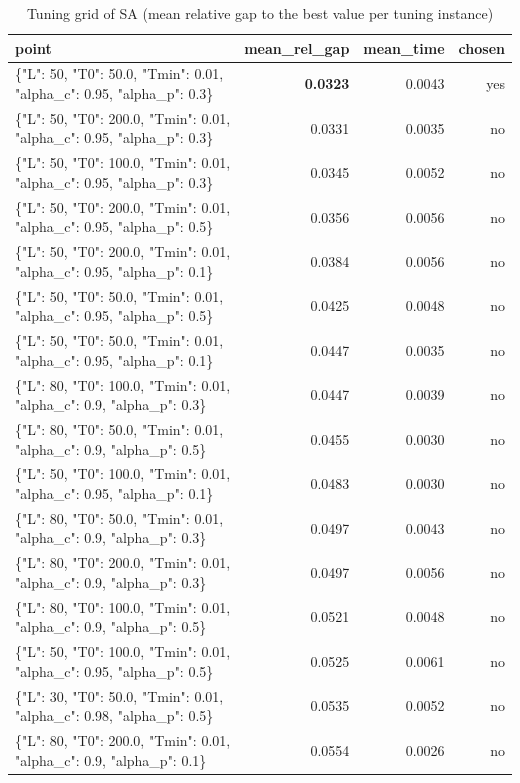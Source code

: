 \begin{table}[htbp]
\centering
\small
\caption{Tuning grid of SA (mean relative gap to the best value per tuning instance)}
\label{tab:E8a_tuning_faithful_SA}
\begin{tabular}{lrrr}
\toprule
point & mean\_rel\_gap & mean\_time & chosen \\
\midrule
\{"L": 50, "T0": 50.0, "Tmin": 0.01, "alpha\_c": 0.95, "alpha\_p": 0.3\} & \textbf{0.0323} & 0.0043 & yes \\
\{"L": 50, "T0": 200.0, "Tmin": 0.01, "alpha\_c": 0.95, "alpha\_p": 0.3\} & 0.0331 & 0.0035 & no \\
\{"L": 50, "T0": 100.0, "Tmin": 0.01, "alpha\_c": 0.95, "alpha\_p": 0.3\} & 0.0345 & 0.0052 & no \\
\{"L": 50, "T0": 200.0, "Tmin": 0.01, "alpha\_c": 0.95, "alpha\_p": 0.5\} & 0.0356 & 0.0056 & no \\
\{"L": 50, "T0": 200.0, "Tmin": 0.01, "alpha\_c": 0.95, "alpha\_p": 0.1\} & 0.0384 & 0.0056 & no \\
\{"L": 50, "T0": 50.0, "Tmin": 0.01, "alpha\_c": 0.95, "alpha\_p": 0.5\} & 0.0425 & 0.0048 & no \\
\{"L": 50, "T0": 50.0, "Tmin": 0.01, "alpha\_c": 0.95, "alpha\_p": 0.1\} & 0.0447 & 0.0035 & no \\
\{"L": 80, "T0": 100.0, "Tmin": 0.01, "alpha\_c": 0.9, "alpha\_p": 0.3\} & 0.0447 & 0.0039 & no \\
\{"L": 80, "T0": 50.0, "Tmin": 0.01, "alpha\_c": 0.9, "alpha\_p": 0.5\} & 0.0455 & 0.0030 & no \\
\{"L": 50, "T0": 100.0, "Tmin": 0.01, "alpha\_c": 0.95, "alpha\_p": 0.1\} & 0.0483 & 0.0030 & no \\
\{"L": 80, "T0": 50.0, "Tmin": 0.01, "alpha\_c": 0.9, "alpha\_p": 0.3\} & 0.0497 & 0.0043 & no \\
\{"L": 80, "T0": 200.0, "Tmin": 0.01, "alpha\_c": 0.9, "alpha\_p": 0.3\} & 0.0497 & 0.0056 & no \\
\{"L": 80, "T0": 100.0, "Tmin": 0.01, "alpha\_c": 0.9, "alpha\_p": 0.5\} & 0.0521 & 0.0048 & no \\
\{"L": 50, "T0": 100.0, "Tmin": 0.01, "alpha\_c": 0.95, "alpha\_p": 0.5\} & 0.0525 & 0.0061 & no \\
\{"L": 30, "T0": 50.0, "Tmin": 0.01, "alpha\_c": 0.98, "alpha\_p": 0.5\} & 0.0535 & 0.0052 & no \\
\{"L": 80, "T0": 200.0, "Tmin": 0.01, "alpha\_c": 0.9, "alpha\_p": 0.1\} & 0.0554 & 0.0026 & no \\

\end{tabular}
\end{table}
